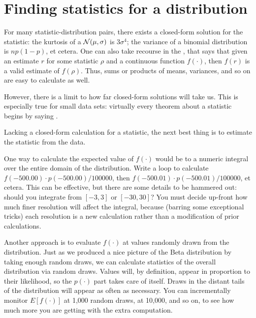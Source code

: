 
\section{Finding statistics for a distribution} \label{billiondraws}
For many statistic-distribution pairs, there exists a closed-form
solution for the statistic: the kurtosis of a ${\cal N}(\mu,\sigma)$
is $3\sigma^4$; the variance of a binomial distribution is $np(1-p)$,
et cetera. One can also take recourse in the , that
says that given an estimate $r$ for some statistic $\rho$ and a continuous
function $f(\cdot)$, then $f(r)$ is a valid estimate of $f(\rho)$. Thus,
sums or products of means, variances, and so on are easy to calculate as well.

However, there is a limit to how far closed-form solutions will take us.
This is especially true for small data sets: virtually every theorem
about a statistic begins by saying .

Lacking a closed-form calculation for a statistic, the next best thing
is to estimate the statistic from the data. 

One way to calculate the expected value of $f(\cdot)$ would be to a numeric
integral over the entire domain of the distribution. Write a loop to
calculate $f(-500.00)\cdot p(-500.00)/100000$, then $f(-500.01)\cdot
p(-500.01)/100000$, et cetera. This can be effective, but there are
some details to be hammered out: should you integrate from $[-3,3]$
or $[-30,30]$? You must decide up-front how much finer resolution will
affect the integral, because (barring some exceptional tricks) each
resolution is a new calculation rather than a modification of prior 
calculations.

Another approach is to evaluate $f(\cdot)$ at values randomly drawn
from the distribution.  Just as we produced a nice picture of the
Beta distribution by taking enough random draws, we can calculate
statistics of the overall distribution via random draws.  Values will,
by definition, appear in proportion to their likelihood, so the $p(\cdot)$
part takes care of itself. Draws in the distant tails of the distribution
will appear as often as necessary.  You can incrementally monitor
$E[f(\cdot)]$ at 1,000 random draws, at 10,000, and so on, to see how
much more you are getting with the extra computation.


